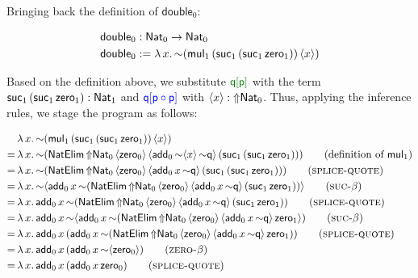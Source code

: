 Bringing back the definition of $\mathsf{double}_0$:

$$
\begin{aligned}
    \mathsf{double}_0&:\mathsf{Nat}_0\to\mathsf{Nat}_0\\
    \mathsf{double}_0&:=\lambda\,x.\,{\sim}(\mathsf{mul}_1\,(\mathsf{suc}_1\,(\mathsf{suc}_1\,\mathsf{zero}_1))\,\langle x\rangle)\\
\end{aligned}
$$

Based on the definition above, we substitute $\textcolor{green}{\q[\p]}$ with the term $\mathsf{suc}_1\,(\mathsf{suc}_1\,\mathsf{zero}_1):\mathsf{Nat}_1$ and $\textcolor{blue}{\mathsf{q}[\mathsf{p}\circ\mathsf{p}]}$ with $\langle x\rangle:{\Uparrow}\mathsf{Nat}_0$. Thus, applying the inference rules, we stage the program as follows:

\begin{align*}
    &\lambda\,x.\,{\sim}(\mathsf{mul}_1\,(\suc_1\,(\suc_1\,\mathsf{zero}_1))\,\langle x\rangle)\\
    =\,&\lambda\,x.\,\spl(\NatElim\,\Lift\Nat_0\,\qut{\mathsf{zero}_0}\,\qut{\mathsf{add}_0\,\spl\qut x\,\spl\q}\,(\suc_1\,(\suc_1\,\mathsf{zero}_1)))\tag{definition of $\mathsf{mul}_1$}\\
    =\,&\lambda\,x.\,\spl(\NatElim\,\Lift\Nat_0\,\qut{\mathsf{zero}_0}\,\qut{\mathsf{add}_0\,x\,\spl\q}\,(\suc_1\,(\suc_1\,\mathsf{zero}_1)))\tag{\textsc{splice-quote}}\\
    =\,&\lambda\,x.\,\spl\qut{\mathsf{add}_0\,x\,\spl(\NatElim\,\Lift\Nat_0\,\qut{\mathsf{zero}_0}\,\qut{\mathsf{add}_0\,x\,\spl\q}\,(\suc_1\,\mathsf{zero}_1))}\tag{\textsc{suc-$\beta$}}\\
    =\,&\lambda\,x.\,\mathsf{add}_0\,x\,\spl(\NatElim\,\Lift\Nat_0\,\qut{\mathsf{zero}_0}\,\qut{\mathsf{add}_0\,x\,\spl\q}\,(\suc_1\,\mathsf{zero}_1))\tag{\textsc{splice-quote}}\\
    =\,&\lambda\,x.\,\mathsf{add}_0\,x\,\spl\qut{\mathsf{add}_0\,x\,\spl(\NatElim\,\Lift\Nat_0\,\qut{\mathsf{zero}_0}\,\qut{\mathsf{add}_0\,x\,\spl\q}\,\mathsf{zero}_1})\tag{\textsc{suc-$\beta$}}\\
    =\,&\lambda\,x.\,\mathsf{add}_0\,x\,(\mathsf{add}_0\,x\,\spl(\NatElim\,\Lift\Nat_0\,\qut{\mathsf{zero}_0}\,\qut{\mathsf{add}_0\,x\,\spl\q}\,\mathsf{zero}_1))\tag{\textsc{splice-quote}}\\
    =\,&\lambda\,x.\,\mathsf{add}_0\,x\,(\mathsf{add}_0\,x\,\spl\qut{\mathsf{zero}_0})\tag{\textsc{zero-$\beta$}}\\
    =\,&\lambda\,x.\,\mathsf{add}_0\,x\,(\mathsf{add}_0\,x\,\mathsf{zero}_0)\tag{\textsc{splice-quote}}\\
\end{align*}


